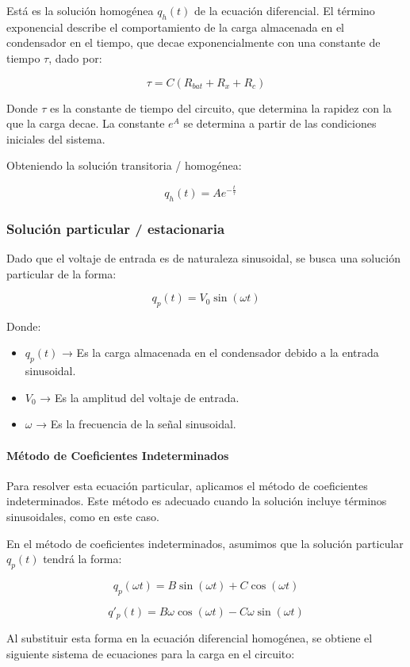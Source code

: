 Está es la solución homogénea \(q_h(t)\) de la ecuación diferencial. El término exponencial
describe el comportamiento de la carga almacenada en el condensador en
el tiempo, que decae exponencialmente con una constante de tiempo \(\tau\), dado por:

\[
	\tau = C(R_{bat} + R_x + R_c)
\]

Donde \(\tau\) es la constante de tiempo del circuito, que determina la rapidez con la que la
carga decae. La constante \(e^A\) se determina a partir de las condiciones iniciales del
sistema.

Obteniendo la solución transitoria / homogénea:

\[
	q_h(t) = A e^{-\frac{t}{\tau}} \quad
\]

\subsubsection*{Solución particular / estacionaria}
Dado que el voltaje de entrada es de naturaleza sinusoidal, se busca una solución particular de
la forma:

\[
	q_p(t) = V_0\sin(\omega t)
\]

Donde:
\begin{itemize}
	\item \(q_p(t)\) → Es la carga almacenada en el condensador debido a la entrada sinusoidal.
	\item \(V_0\) → Es la amplitud del voltaje de entrada.
	\item \(\omega\) → Es la frecuencia de la señal sinusoidal.
\end{itemize}

\paragraph*{Método de Coeficientes Indeterminados}
Para resolver esta ecuación particular, aplicamos el método de coeficientes indeterminados.
Este método es adecuado cuando la solución incluye términos sinusoidales, como en este
caso.

En el método de coeficientes indeterminados, asumimos que la solución particular \( q_p(t) \)
tendrá la forma:

\[
	q_p(\omega t) = B \sin(\omega t) + C \cos(\omega t)
\]

\[
	q'_p(t) = B\omega \cos(\omega t) - C\omega \sin(\omega t)
\]

Al substituir esta forma en la ecuación diferencial homogénea, se obtiene el siguiente sistema
de ecuaciones para la carga en el circuito:

